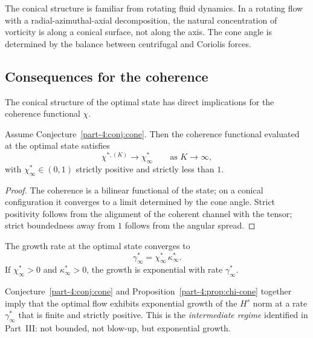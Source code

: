 \begin{remark}\label{part-4:rem:physical}
The conical structure is familiar from rotating fluid dynamics. In a 
rotating flow with a radial-azimuthal-axial decomposition, the 
natural concentration of vorticity is along a conical surface, not 
along the axis. The cone angle is determined by the balance between 
centrifugal and Coriolis forces.
\end{remark}

\subsection{Consequences for the coherence}
\label{part-4:ssec:cone-coherence}

The conical structure of the optimal state has direct implications 
for the coherence functional $\chi$.

\begin{proposition}\label{part-4:prop:chi-cone}
Assume Conjecture~\ref{part-4:conj:cone}. Then the coherence functional 
evaluated at the optimal state satisfies
\begin{equation}\label{part-4:eq:chi-cone}
\chi^{\ast,(K)} \to \chi^\ast_\infty
\qquad\text{as }K\to\infty,
\end{equation}
with $\chi^\ast_\infty\in(0,1)$ strictly positive and strictly less 
than $1$.
\end{proposition}

\begin{proof}
The coherence is a bilinear functional of the state; on a conical 
configuration it converges to a limit determined by the cone angle. 
Strict positivity follows from the alignment of the coherent channel 
with the tensor; strict boundedness away from $1$ follows from the 
angular spread.
\end{proof}

\begin{corollary}\label{part-4:cor:gamma-cone}
The growth rate at the optimal state converges to
\begin{equation}\label{part-4:eq:gamma-cone}
\gamma^\ast_\infty = \chi^\ast_\infty\,\kappa^\ast_\infty.
\end{equation}
If $\chi^\ast_\infty > 0$ and $\kappa^\ast_\infty > 0$, the growth 
is exponential with rate $\gamma^\ast_\infty$.
\end{corollary}

\begin{remark}[Interpretation]\label{part-4:rem:cone-interp}
Conjecture~\ref{part-4:conj:cone} and Proposition~\ref{part-4:prop:chi-cone} 
together imply that the optimal flow exhibits exponential growth of 
the $H^s$ norm at a rate $\gamma^\ast_\infty$ that is finite and 
strictly positive. This is the \emph{intermediate regime} identified 
in Part~III: not bounded, not blow-up, but exponential growth.
\end{remark}

